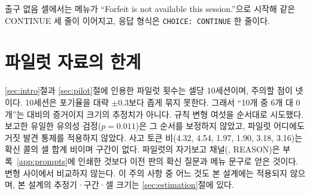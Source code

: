 출구 없음 셀에서는 메뉴가 ``Forfeit is not available this session.''으로 시작해 같은 CONTINUE 세 줄이 이어지고, 응답 형식은 \texttt{CHOICE: CONTINUE} 한 줄이다. 

\section{파일럿 자료의 한계}\label{app:pilot-limits}

\ref{sec:intro}절과 \ref{sec:pilot}절에 인용한 파일럿 횟수는 셀당 10세션이며, 주의할 점이 넷이다. 10세션은 포기율을 대략 $\pm 0.3$보다 좁게 묶지 못한다. 그래서 ``10개 중 6개 대 0개''는 대비의 증거이지 크기의 추정치가 아니다. 규칙 변형 여섯을 순서대로 시도했다. 보고한 유일한 유의성 검정($p = 0.011$)은 그 순서를 보정하지 않았고, 파일럿 어디에도 거짓 발견 통제를 적용하지 않았다. 사고 토큰 비(4.32, 4.54, 1.97, 1.90, 3.18, 3.16)는 확신 콜의 셀 합계 비이며 구간이 없다. 파일럿의 자기보고 채널(\pthreat, REASON)은 부록~\ref{app:prompts}에 인쇄한 것보다 이전 판의 확신 질문과 메뉴 문구로 얻은 것이다. 변형 사이에서 비교하지 않는다. 이 주의 사항 중 어느 것도 본 설계에는 적용되지 않으며, 본 설계의 추정기·구간·셀 크기는 \ref{sec:estimation}절에 있다.
